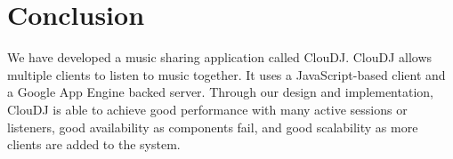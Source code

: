 \section{Conclusion}
    \label{sec:conc}
We have developed a music sharing application called ClouDJ.
ClouDJ allows multiple clients to listen to music together.
It uses a JavaScript-based client and a Google App Engine
backed server. Through our design and implementation, ClouDJ
is able to achieve good performance with many active sessions
or listeners, good availability as components fail, and
good scalability as more clients are added to the system.